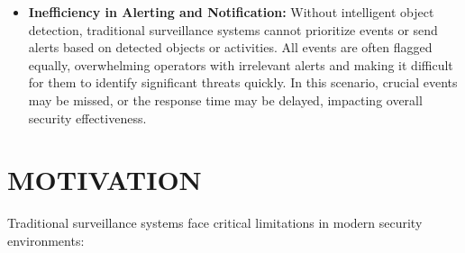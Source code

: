 \documentclass[12pt]{report}
\begin{document}
\begin{itemize}[leftmargin=*, nosep]
    \item \textbf{Inefficiency in Alerting and Notification:} Without intelligent object detection, traditional surveillance systems cannot prioritize events or send alerts based on detected objects or activities. All events are often flagged equally, overwhelming operators with irrelevant alerts and making it difficult for them to identify significant threats quickly. In this scenario, crucial events may be missed, or the response time may be delayed, impacting overall security effectiveness.
\end{itemize}



\section{MOTIVATION}
Traditional surveillance systems face critical limitations in modern security environments:
\end{document}

